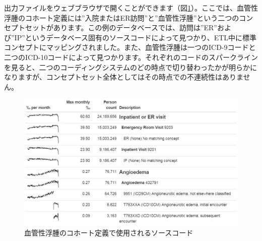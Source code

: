 \documentclass[
  11pt]{book}
\newenvironment{Shaded}{\begin{snugshade}}{\end{snugshade}}
\newcommand{\AttributeTok}[1]{\textcolor[rgb]{0.13,0.29,0.53}{#1}}
\newcommand{\FunctionTok}[1]{\textcolor[rgb]{0.13,0.29,0.53}{\textbf{#1}}}
\newcommand{\NormalTok}[1]{#1}
\newcommand{\OtherTok}[1]{\textcolor[rgb]{0.56,0.35,0.01}{#1}}
\newcommand{\SpecialCharTok}[1]{\textcolor[rgb]{0.81,0.36,0.00}{\textbf{#1}}}
\newcommand{\StringTok}[1]{\textcolor[rgb]{0.31,0.60,0.02}{#1}}
\theoremstyle{definition}
\theoremstyle{definition}
\theoremstyle{definition}
\theoremstyle{definition}
\theoremstyle{remark}
\begin{document}
\begin{Shaded}
\end{Shaded}

出力ファイルをウェブブラウザで開くことができます（図\ref{fig:sourceCodesAngioedema}）。ここでは、血管性浮腫のコホート定義には''入院またはER訪問''と''血管性浮腫''という二つのコンセプトセットがあります。この例のデータベースでは、訪問は''ER''および''IP''というデータベース固有のソースコードによって見つかり、ETL中に標準コンセプトにマッピングされました。また、血管性浮腫は一つのICD-9コードと二つのICD-10コードによって見つかります。それぞれのコードのスパークラインを見ると、二つのコーディングシステムのどの時点で切り替わったかが明らかになりますが、コンセプトセット全体としてはその時点での不連続性はありません。

\begin{figure}

{\centering \includegraphics[width=1\linewidth]{images/DataQuality/sourceCodesAngioedema} 

}

\caption{血管性浮腫のコホート定義で使用されるソースコード}\label{fig:sourceCodesAngioedema}
\end{figure}
\end{document}
